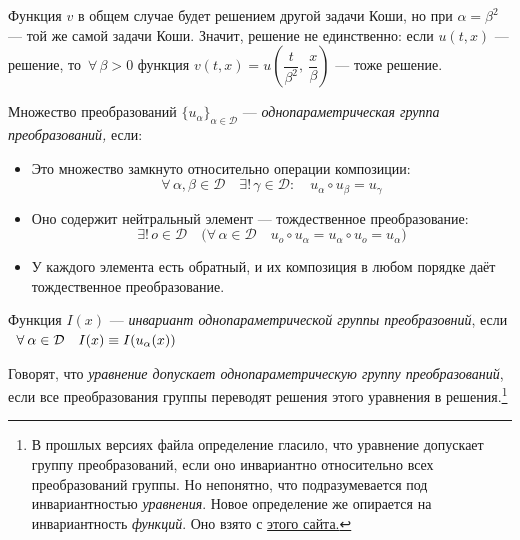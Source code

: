 \documentclass[../main.tex]{subfiles}
\begin{document}
Функция $v$ в общем случае будет решением другой задачи Коши, но при $\alpha = \beta^2$ --- той же самой задачи Коши. Значит, решение не единственно: если $u(t,x)$ --- решение, то $\,\forall\, \beta > 0$ функция $v(t,x) = u\left(\dfrac{t}{\beta^2},\ \dfrac{x}{\beta}\right)$ --- тоже решение.

\begin{definition} 
Множество преобразований $\{u_{\alpha}\}_{\alpha \in \mathcal{D}}$ --- \emph{однопараметрическая группа преобразований,} если:
\begin{itemize}
	\item Это множество замкнуто относительно операции композиции:
	$$\forall\, \alpha, \beta \in \mathcal{D} \quad \exists!\,\gamma \in \mathcal{D}\colon \quad u_\alpha \circ u_\beta = u_\gamma$$
	
	\item Оно содержит нейтральный элемент --- тождественное преобразование:
	$$\exists!\, o \in \mathcal{D} \quad \bigl(\forall\, \alpha \in \mathcal{D} \quad u_o \circ u_\alpha = u_\alpha \circ u_o = u_\alpha \bigr)$$
	
	\item У каждого элемента есть обратный, и их композиция в любом порядке даёт тождественное преобразование.
\end{itemize}
\end{definition}
	
\begin{definition}
	Функция $I(x)$ --- \textit{инвариант однопараметрической группы преобразовний}, если $\;\;\forall\: \alpha \in \mathcal{D} \quad I(x) \equiv I(u_{\alpha}(x))$
	\end{definition}
	\begin{definition}
	Говорят, что \textit{уравнение допускает однопараметрическую группу преобразований}, если все преобразования группы переводят решения этого уравнения в решения.\footnote{В прошлых версиях файла определение гласило, что уравнение допускает группу преобразований, если оно инвариантно относительно всех преобразований группы. Но непонятно, что подразумевается под инвариантностью \emph{уравнения}. Новое определение же опирается на инвариантность \emph{функций}. Оно взято с \href{https://matem.anrb.ru/bsuconf/2012/adlerv7.pdf}{этого сайта.}}
\end{definition}
\end{document}
